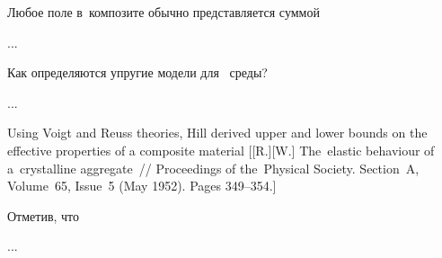 \begin{otherlanguage}{russian}

Любое поле в~композите обычно представляется суммой

...



\end{otherlanguage}



\begin{otherlanguage}{russian}

Как определяются упругие модели для~ среды?

...



\end{otherlanguage}



\begin{otherlanguage}{russian}

{\small \noindent Using Voigt and Reuss theories, Hill derived upper and lower bounds on the effective properties of a composite material [[R.][W.] The~elastic behaviour of a~crystalline aggregate~// Proceedings of the~Physical Society. Section~A, Volume~65, Issue~5 (May 1952). Pages 349\hbox{--}354.]
\par}

Отметив, что

...



\end{otherlanguage}


